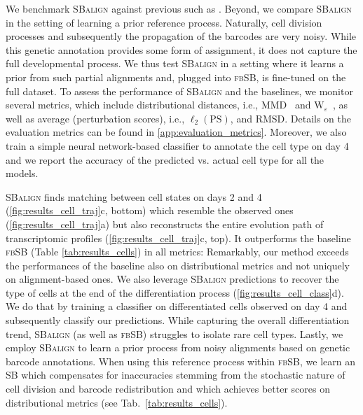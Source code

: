 We benchmark \textsc{SBalign} against previous  such as \citep[\textsc{fbSB}]{chen2021likelihood}. Beyond, we compare \textsc{SBalign} in the setting of learning a prior reference process. Naturally, cell division processes and subsequently the propagation of the barcodes are very noisy. While this genetic annotation provides some form of assignment, it does not capture the full developmental process. We thus test \textsc{SBalign} in a setting where it learns a prior from such partial alignments and, plugged into \textsc{fbSB}, is fine-tuned on the full dataset.
To assess the performance of \textsc{SBalign} and the baselines, we monitor several metrics, which include distributional distances, i.e., MMD~\citep{gretton2012kernel} and $\text{W}_{\varepsilon}$~\citep{cuturi2013sinkhorn}, as well as average (perturbation scores), i.e., $\ell_2(\text{PS})$, and RMSD. Details on the evaluation metrics can be found in \cref{app:evaluation_metrics}.
Moreover, we also train a simple neural network-based classifier to annotate the cell type on day 4 and we report the accuracy of the predicted vs. actual cell type for all the models.


\textsc{SBalign} finds matching between cell states on days 2 and 4 (\cref{fig:results_cell_traj}c, bottom) which resemble the observed ones (\cref{fig:results_cell_traj}a) but also reconstructs the entire evolution path of transcriptomic profiles (\cref{fig:results_cell_traj}c, top).
It outperforms the baseline \textsc{fbSB} (Table \ref{tab:results_cells}) in all metrics: Remarkably, our method exceeds the performances of the baseline also on distributional metrics and not uniquely on alignment-based ones.
We also leverage \textsc{SBalign} predictions to recover the type of cells at the end of the differentiation process (\cref{fig:results_cell_class}d). We do that by training a classifier on differentiated cells observed on day 4 and subsequently classify our predictions. %
While capturing the overall differentiation trend, \textsc{SBalign} (as well as \textsc{fbSB}) struggles to isolate rare cell types.
Lastly, we employ \textsc{SBalign} to learn a prior process from noisy alignments based on genetic barcode annotations. When using this reference process within \textsc{fbSB}, we learn an SB which compensates for inaccuracies stemming from the stochastic nature of cell division and barcode redistribution and which achieves better scores on distributional metrics (see Tab.~\ref{tab:results_cells}).

